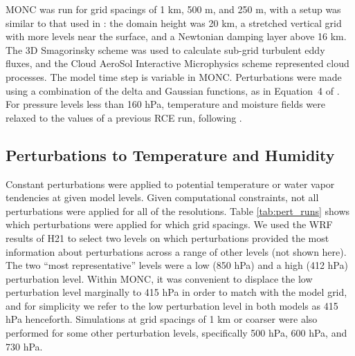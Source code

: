 \documentclass[draft]{agujournal2019}
\begin{document}
MONC was run for grid spacings of 1 km, 500 m, and 250 m, with a setup was
similar to that used in : the domain height was 20 km, a
stretched vertical grid with more levels near the surface, and a Newtonian
damping layer above 16 km. The 3D Smagorinsky scheme \cite{Smag63,Lilly67} was
used to calculate sub-grid turbulent eddy fluxes, and the Cloud AeroSol
Interactive Microphysics \cite<CASIM, see>{field23} scheme represented cloud
processes. The model time step is variable in MONC. Perturbations were made
using a combination of the delta and Gaussian functions, as in Equation~4 of
. For pressure levels less than 160 hPa, temperature
and moisture fields were relaxed to the values of a previous RCE run, following
.

\subsection{Perturbations to Temperature and Humidity}

Constant perturbations were applied to potential temperature or water vapor
tendencies at given model levels. Given computational constraints, not all
perturbations were applied for all of the resolutions.  Table
\ref{tab:pert_runs} shows which perturbations were applied for which grid
spacings. We used the WRF results of H21 to select two levels on which
perturbations provided the most information about perturbations across a range
of other levels (not shown here). The two ``most representative'' levels were a
low (850 hPa) and a high (412 hPa) perturbation level. Within MONC, it was
convenient to displace the low perturbation level marginally to 415 hPa in order
to match with the model grid, and for simplicity we refer to the low
perturbation level in both models as 415 hPa henceforth. Simulations at grid
spacings of 1 km or coarser were also performed for some other perturbation
levels, specifically 500 hPa, 600 hPa, and 730 hPa.
\end{document}
